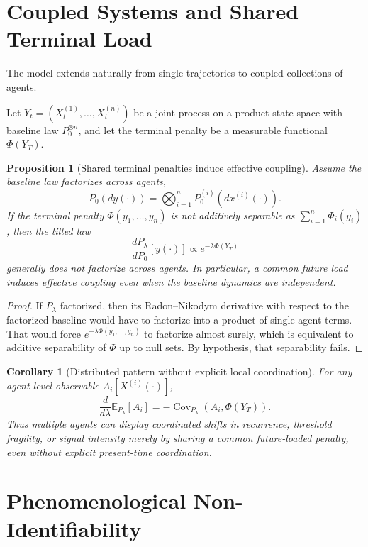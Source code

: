 \documentclass[12pt]{article}
\newtheorem{proposition}{Proposition}
\newtheorem{corollary}{Corollary}
\begin{document}
\section{Coupled Systems and Shared Terminal Load}

The model extends naturally from single trajectories to coupled collections of agents.

Let $Y_t = (X_t^{(1)},\dots,X_t^{(n)})$ be a joint process on a product state space with baseline law $P_0^{\otimes n}$, and let the terminal penalty be a measurable functional $\Phi(Y_T)$.

\begin{proposition}[Shared terminal penalties induce effective coupling]
Assume the baseline law factorizes across agents,
\[
P_0(dy(\cdot)) = \bigotimes_{i=1}^n P_0^{(i)}(dx^{(i)}(\cdot)).
\]
If the terminal penalty $\Phi(y_1,\dots,y_n)$ is not additively separable as $\sum_{i=1}^n \Phi_i(y_i)$, then the tilted law
\[
\frac{dP_\lambda}{dP_0}[y(\cdot)] \propto e^{-\lambda \Phi(Y_T)}
\]
generally does not factorize across agents. In particular, a common future load induces effective coupling even when the baseline dynamics are independent.
\end{proposition}

\begin{proof}
If $P_\lambda$ factorized, then its Radon--Nikodym derivative with respect to the factorized baseline would have to factorize into a product of single-agent terms. That would force $e^{-\lambda \Phi(y_1,\dots,y_n)}$ to factorize almost surely, which is equivalent to additive separability of $\Phi$ up to null sets. By hypothesis, that separability fails.
\end{proof}

\begin{corollary}[Distributed pattern without explicit local coordination]
For any agent-level observable $A_i[X^{(i)}(\cdot)]$,
\[
\frac{d}{d\lambda}\mathbb E_{P_\lambda}[A_i]
= -\operatorname{Cov}_{P_\lambda}(A_i,\Phi(Y_T)).
\]
Thus multiple agents can display coordinated shifts in recurrence, threshold fragility, or signal intensity merely by sharing a common future-loaded penalty, even without explicit present-time coordination.
\end{corollary}

\section{Phenomenological Non-Identifiability}
\end{document}
